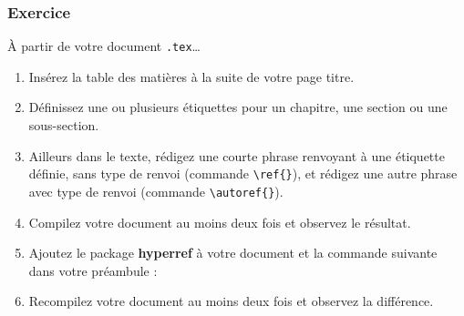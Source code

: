 
\begin{frame}[fragile]

	\frametitle{Exercice \thenoExercice}
	
	À partir de votre document \texttt{.tex}\dots	
	\begin{enumerate}
		\item Insérez la table des matières à la suite de votre page titre.
		\item Définissez une ou plusieurs étiquettes pour un chapitre, une section ou une %
			sous-section.
		\item Ailleurs dans le texte, rédigez une courte phrase renvoyant à une étiquette 
			définie, sans type de renvoi (commande \lstinline|\ref{}|), et rédigez une autre 
			phrase avec type de renvoi (commande \lstinline|\autoref{}|).
		\item Compilez votre document au moins deux fois et observez le résultat.
		\item Ajoutez le package \textbf{hyperref} à votre document et la commande suivante dans 
			votre préambule :
	\begin{codesource}
	\hypersetup{colorlinks=true,allcolors=blue}
	\end{codesource}
		\item Recompilez votre document au moins deux fois et observez la différence.
	\end{enumerate}
\end{frame}
